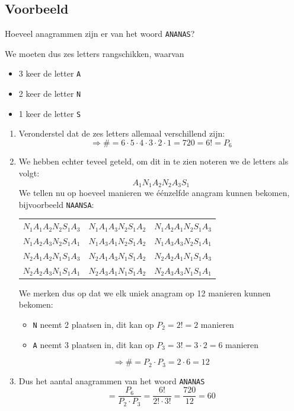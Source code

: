 \documentclass[12pt,twoside]{article}
\begin{document}
\begin{theorie}

\subsection{Voorbeeld}

Hoeveel anagrammen zijn er van het woord \verb#ANANAS#?

We moeten dus zes letters rangschikken, waarvan
\begin{itemize}
  \item 3 keer de letter \verb#A#
  \item 2 keer de letter \verb#N#
  \item 1 keer de letter \verb#S#
\end{itemize}

\begin{enumerate}
  \item Veronderstel dat de zes letters allemaal verschillend zijn:\\
  $$\Rightarrow \#=6\cdot5\cdot4\cdot3\cdot2\cdot1=720=6!=P_6$$
  \item We hebben echter teveel geteld, om dit in te zien noteren we de letters als volgt:
  $$A_1N_1A_2N_2A_3S_1$$
  We tellen nu op hoeveel manieren we éénzelfde anagram kunnen bekomen, bijvoorbeeld \verb#NAANSA#:
  \begin{center}
  \begin{tabular}{ccc}
    $N_1A_1A_2N_2S_1A_3$ & $N_1A_1A_3N_2S_1A_2$ & $N_1A_2A_1N_2S_1A_3$\\
    $N_1A_2A_3N_2S_1A_1$ & $N_1A_3A_1N_2S_1A_2$ & $N_1A_3A_3N_2S_1A_1$\\
    $N_2A_1A_2N_1S_1A_3$ & $N_2A_1A_3N_1S_1A_2$ & $N_2A_2A_1N_1S_1A_3$\\
    $N_2A_2A_3N_1S_1A_1$ & $N_2A_3A_1N_1S_1A_2$ & $N_2A_3A_3N_1S_1A_1$\\
  \end{tabular}
  \end{center}
  We merken dus op dat we elk uniek anagram op 12 manieren kunnen bekomen:
  \begin{itemize}
    \item \verb#N# neemt 2 plaatsen in, dit kan op $P_2=2!=2$ manieren
    \item \verb#A# neemt 3 plaatsen in, dit kan op $P_3=3!=3\cdot2=6$ manieren
  \end{itemize}
  $$\Rightarrow \#=P_2\cdot P_3=2\cdot6=12$$
  \item Dus het aantal anagrammen van het woord \verb#ANANAS#
  $$=\dfrac{P_6}{P_2\cdot P_3}=\dfrac{6!}{2!\cdot 3!}=\dfrac{720}{12}=60$$
\end{enumerate}

\end{theorie}
\end{document}
